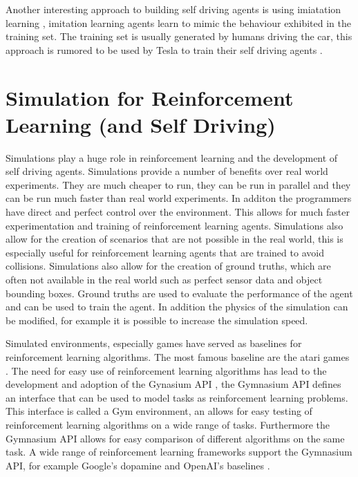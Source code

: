 Another interesting approach to building self driving agents is using imiatation learning \autocite{imitation_learning}, imitation learning agents learn to mimic the behaviour exhibited in the training set. The training set is usually generated by humans driving the car, this approach is rumored to be used by Tesla to train their self driving agents \autocite{teslaEndToEnd}.









\section{Simulation for Reinforcement Learning (and Self Driving)}

Simulations play a huge role in reinforcement learning and the development of self driving agents. Simulations provide a number of benefits over real world experiments. They are much cheaper to run, they can be run in parallel and they can be run much faster than real world experiments. In additon the programmers have direct and perfect control over the environment. This allows for much faster experimentation and training of reinforcement learning agents. Simulations also allow for the creation of scenarios that are not possible in the real world, this is especially useful for reinforcement learning agents that are trained to avoid collisions. Simulations also allow for the creation of ground truths, which are often not available in the real world such as perfect sensor data and object bounding boxes. Ground truths are used to evaluate the performance of the agent and can be used to train the agent. In addition the physics of the simulation can be modified, for example it is possible to increase the simulation speed.

Simulated environments, especially games have served as baselines for reinforcement learning algorithms. The most famous baseline are the atari games \autocite{atari}. The need for easy use of reinforcement learning algorithms has lead to the development and adoption of the Gynasium API \autocite{gymnasium}, the Gymnasium API defines an interface that can be used to model tasks as reinforcement learning problems. This interface is called a Gym environment, an allows for easy testing of reinforcement learning algorithms on a wide range of tasks. Furthermore the Gymnasium API allows for easy comparison of different algorithms on the same task. A wide range of reinforcement learning frameworks support the Gymnasium API, for example Google's dopamine \autocite{dopamine} and OpenAI's baselines \autocite{sb3}.

